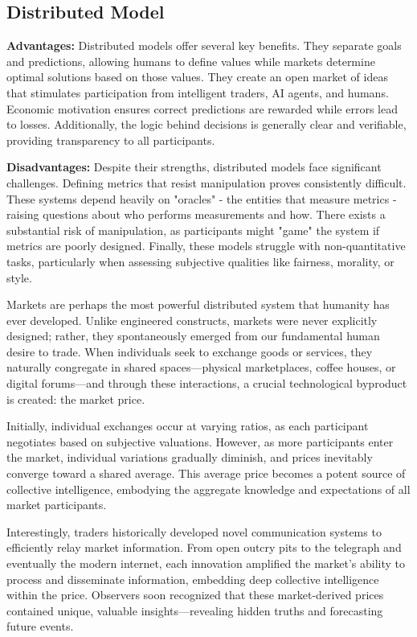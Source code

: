 \documentclass[12pt]{article}
\begin{document}
\subsection{Distributed Model}
\textbf{Advantages:} Distributed models offer several key benefits. They separate goals and predictions, allowing humans to define values while markets determine optimal solutions based on those values. They create an open market of ideas that stimulates participation from intelligent traders, AI agents, and humans. Economic motivation ensures correct predictions are rewarded while errors lead to losses. Additionally, the logic behind decisions is generally clear and verifiable, providing transparency to all participants.

\textbf{Disadvantages:} Despite their strengths, distributed models face significant challenges. Defining metrics that resist manipulation proves consistently difficult. These systems depend heavily on "oracles" - the entities that measure metrics - raising questions about who performs measurements and how. There exists a substantial risk of manipulation, as participants might "game" the system if metrics are poorly designed. Finally, these models struggle with non-quantitative tasks, particularly when assessing subjective qualities like fairness, morality, or style.


Markets are perhaps the most powerful distributed system that humanity has ever developed. Unlike engineered constructs, markets were never explicitly designed; rather, they spontaneously emerged from our fundamental human desire to trade. When individuals seek to exchange goods or services, they naturally congregate in shared spaces—physical marketplaces, coffee houses, or digital forums—and through these interactions, a crucial technological byproduct is created: the market price.

Initially, individual exchanges occur at varying ratios, as each participant negotiates based on subjective valuations. However, as more participants enter the market, individual variations gradually diminish, and prices inevitably converge toward a shared average. This average price becomes a potent source of collective intelligence, embodying the aggregate knowledge and expectations of all market participants.

Interestingly, traders historically developed novel communication systems to efficiently relay market information. From open outcry pits to the telegraph and eventually the modern internet, each innovation amplified the market's ability to process and disseminate information, embedding deep collective intelligence within the price. Observers soon recognized that these market-derived prices contained unique, valuable insights—revealing hidden truths and forecasting future events.
\end{document}
